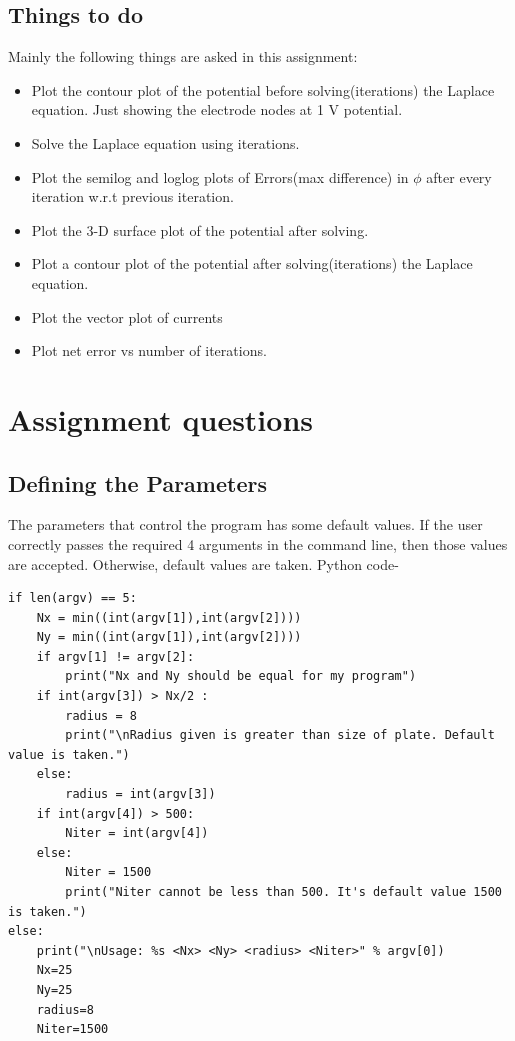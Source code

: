 \documentclass[11pt, a4paper]{article}
\begin{document}
\subsection{Things to do}
Mainly the following things are asked in this assignment:
    \begin{itemize}
        \item Plot the contour plot of the potential before solving(iterations) the Laplace equation. Just showing the electrode nodes at 1 V potential.
        \item Solve the Laplace equation using iterations.
        \item Plot the semilog and loglog plots of Errors(max difference) in $\phi$ after every iteration w.r.t previous iteration.
        \item Plot the 3-D surface plot of the potential after solving.
        \item Plot a contour plot of the potential after solving(iterations) the Laplace equation.
        \item Plot the vector plot of currents
        \item Plot net error vs number of iterations.
    \end{itemize}
\section{Assignment questions}
    \subsection{Defining the Parameters}
    The parameters that control the program has some default values. If the user correctly passes the required 4 arguments in the command line, then those values are accepted. Otherwise, default values are taken. Python code-
    \begin{verbatim}
if len(argv) == 5:
    Nx = min((int(argv[1]),int(argv[2])))
    Ny = min((int(argv[1]),int(argv[2])))
    if argv[1] != argv[2]:
        print("Nx and Ny should be equal for my program")
    if int(argv[3]) > Nx/2 :
        radius = 8
        print("\nRadius given is greater than size of plate. Default value is taken.")
    else:
        radius = int(argv[3])
    if int(argv[4]) > 500:
        Niter = int(argv[4])
    else:
        Niter = 1500
        print("Niter cannot be less than 500. It's default value 1500 is taken.")
else:
    print("\nUsage: %s <Nx> <Ny> <radius> <Niter>" % argv[0])    
    Nx=25
    Ny=25
    radius=8
    Niter=1500
    \end{verbatim}
\end{document}
